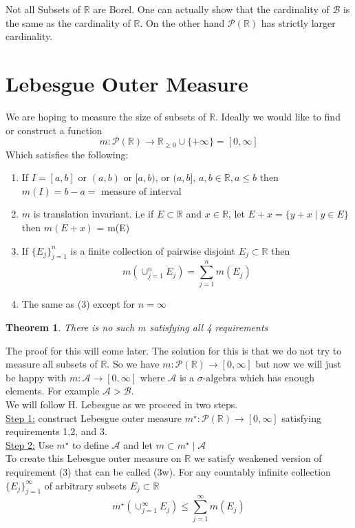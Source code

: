 \documentclass[11pt]{article}
\newtheorem{theorem}{Theorem}[section]
\newcommand{\siga}{\sigma\text{-algebra}}
\newcommand{\pwr}[1]{\mathcal{P}(\mathbb{#1})}
\begin{document}
    Not all Subsets of $\mathbb{R}$ are Borel.
    One can actually show that the cardinality of $\mathcal{B}$ is the same as the cardinality of $\mathbb{R}$.
    On the other hand $\mathcal{P}(\mathbb{R})$ has strictly larger cardinality.


    \section{Lebesgue Outer Measure}\label{sec:legesgue-outer-measure}

    We are hoping to measure the size of subsets of $\mathbb{R}$.
    Ideally we would like to find or construct a function
    \[
        m: \pwr{R} \rightarrow \mathbb{R}_{\geq 0} \cup \{ + \infty \} = [0, \infty]
    \]
    Which satisfies the following:
    \begin{enumerate}
        \item If $I=[a,b]$ or $(a,b)$ or $[a,b)$, or $(a,b]$, $a,b \in \mathbb{R}, a \leq b$ then $m(I) = b-a = $ measure of interval
        \item $m$ is translation invariant.
        i.e if $E \subset \mathbb{R}$ and $x \in \mathbb{R}$, let $E + x = \{ y+x \mid y \in E \}$ then $m(E+x)$ = m(E)
        \item If $\{ E_j \}_{j=1}^{n}$ is a finite collection of pairwise disjoint $E_j \subset \mathbb{R}$ then
        \[
            m \left( \cup_{j=1}^{n} E_j \right) = \sum_{j=1}^{n} m(E_j)
        \]
        \item The same as (3) except for $n = \infty$
    \end{enumerate}

    \begin{theorem}
        There is no such $m$ satisfying all 4 requirements
    \end{theorem}

    The proof for this will come later.
    The solution for this is that we do not try to measure all subsets of $\mathbb{R}$.
    So we have $m: \pwr{R} \rightarrow [0, \infty]$ but now we will just be happy with $m: \mathcal{A} \rightarrow [0,\infty]$ where $\mathcal{A}$ is a $\siga$ which has enough elements.
    For example $\mathcal{A} > \mathcal{B}$.\\

    We will follow H. Lebesgue as we proceed in two steps.\\

    \underline{Step 1:} construct Lebesgue outer measure $m^{\star}: \pwr{R} \rightarrow [0, \infty]$ satisfying requirements 1,2, and 3.\\

    \underline{Step 2:} Use $m^{\star}$ to define $\mathcal{A}$ and let $m \subset m^{\star} \mid \mathcal{A}$\\

    To create this Lebesgue outer measure on $\mathbb{R}$ we satisfy weakened version of requirement (3) that can be called (3w).
    For any countably infinite collection $\{ E_j \}_{j=1}^{\infty}$ of arbitrary subsets $E_j \subset \mathbb{R}$
    \[
        m^{\star}(\cup_{j=1}^{\infty} E_j) \leq \sum_{j=1}^{\infty} m(E_j)
    \]
\end{document}
